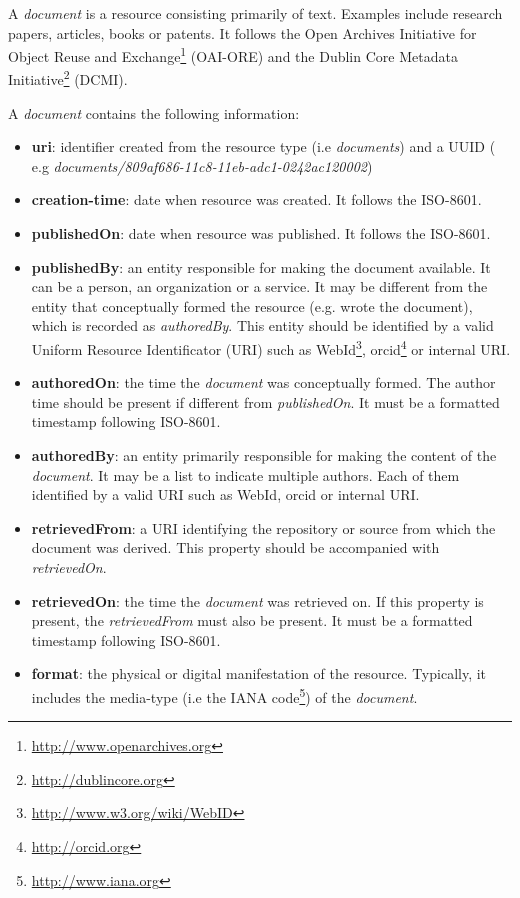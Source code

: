 A \textit{document} is a resource consisting primarily of text. Examples include research papers, articles, books or patents. It follows the Open Archives Initiative for Object Reuse and Exchange\footnote{\url{http://www.openarchives.org}} (OAI-ORE) and the Dublin Core Metadata Initiative\footnote{\url{http://dublincore.org}} (DCMI). 

A \textit{document} contains the following information:                                                              

\begin{itemize}
\item \textbf{uri}: identifier created from the resource type (i.e \textit{documents}) and a UUID ( e.g \textit{documents/809af686-11c8-11eb-adc1-0242ac120002})
\item \textbf{creation-time}: date when resource was created. It follows the ISO-8601.
\item \textbf{publishedOn}: date when resource was published. It follows the ISO-8601.
\item \textbf{publishedBy}: an entity responsible for making the document available. It can be a  person, an  organization or a service. It may be different from the entity that conceptually formed the resource (e.g. wrote the document), which is recorded as \textit{authoredBy}. This entity should be identified by a valid Uniform Resource  Identificator (URI) such as WebId\footnote{\url{http://www.w3.org/wiki/WebID}}, orcid\footnote{\url{http://orcid.org}} or internal URI. 
\item \textbf{authoredOn}: the time the \textit{document} was conceptually formed. The author time should be present if different from \textit{publishedOn}. It must be a formatted timestamp following ISO-8601.
\item \textbf{authoredBy}: an entity primarily responsible for making the content of the \textit{document}. It may be a list to indicate multiple authors. Each of them identified by a valid URI such as WebId, orcid or internal URI.
\item \textbf{retrievedFrom}: a URI identifying the repository or source from which the document was derived. This property should be accompanied with \textit{retrievedOn}.
\item \textbf{retrievedOn}: the time the \textit{document} was retrieved on. If this property is present, the \textit{retrievedFrom} must also be present. It must be a formatted timestamp following ISO-8601.
\item \textbf{format}: the physical or digital manifestation of the resource. Typically, it includes the media-type (i.e the IANA code\footnote{\url{http://www.iana.org}}) of the \textit{document}.

\end{itemize}
